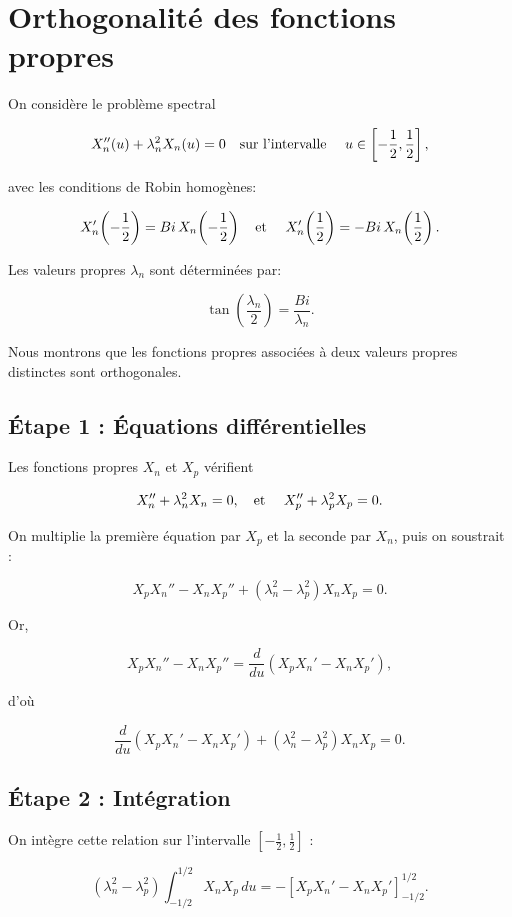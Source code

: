 \documentclass[10pt]{article}
\begin{document}
\section*{Orthogonalité des fonctions propres}

On considère le problème spectral

\[
X_n''(u)+\lambda_n^2X_n(u)=0
\text{\quad sur l'intervalle \quad} u\in\left[-\frac12,\frac12\right],
\]

avec les conditions de Robin homogènes:

\[
X_n'\!\left(-\frac12\right)
=
Bi\,X_n\!\left(-\frac12\right)
\text{\quad et \quad}
X_n'\!\left(\frac12\right)
=
-Bi\,X_n\!\left(\frac12\right).
\]

Les valeurs propres $\lambda_n$ sont déterminées par:

\[
\tan\left(\frac{\lambda_n}{2}\right)
=
\frac{Bi}{\lambda_n}.
\]

Nous montrons que les fonctions propres associées à deux valeurs propres distinctes sont orthogonales.

\subsection*{Étape 1 : Équations différentielles}

Les fonctions propres $X_n$ et $X_p$ vérifient

\[
X_n''+\lambda_n^2X_n=0,
\text{\quad et \quad}
X_p''+\lambda_p^2X_p=0.
\]

On multiplie la première équation par $X_p$ et la seconde par $X_n$, puis on soustrait :

\[
X_pX_n''
-
X_nX_p''
+
(\lambda_n^2-\lambda_p^2)X_nX_p
=
0.
\]

Or,

\[
X_pX_n''
-
X_nX_p''
=
\frac{d}{du}
\left(
X_pX_n'
-
X_nX_p'
\right),
\]

d'où

\[
\frac{d}{du}
\left(
X_pX_n'
-
X_nX_p'
\right)
+
(\lambda_n^2-\lambda_p^2)X_nX_p
=
0.
\]

\subsection*{Étape 2 : Intégration}

On intègre cette relation sur l'intervalle
$\left[-\frac12,\frac12\right]$ :

\[
(\lambda_n^2-\lambda_p^2)
\int_{-1/2}^{1/2}
X_nX_p\,du
=
-
\left[
X_pX_n'
-
X_nX_p'
\right]_{-1/2}^{1/2}.
\]
\end{document}
